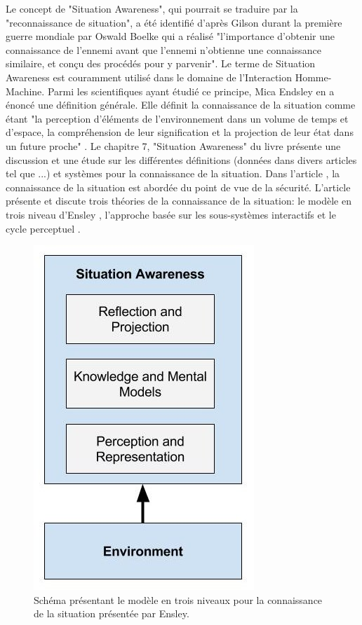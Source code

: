 \documentclass[a4paper,11pt,twoside]{StyleThese}
\begin{document}
Le concept de "Situation Awareness", qui pourrait se traduire par la "reconnaissance de situation", a été identifié d'après Gilson \cite{gilson1995} durant la première guerre mondiale par Oswald Boelke qui a réalisé "l'importance d'obtenir une connaissance de l'ennemi avant que l'ennemi n'obtienne une connaissance similaire, et conçu des procédés pour y parvenir". Le terme de Situation Awareness est couramment utilisé dans le domaine de l'Interaction Homme-Machine. Parmi les scientifiques ayant étudié ce principe, Mica Endsley en a énoncé une définition générale. Elle définit la connaissance de la situation comme étant "la perception d'éléments de l'environnement dans un volume de temps et d'espace, la compréhension de leur signification et la projection de leur état dans un future proche" \cite{endsley2000}.
Le chapitre 7, "Situation Awareness" du livre \cite{pew1998modeling} présente une discussion et une étude sur les différentes définitions (données dans divers articles tel que \cite{stiffler1988graduate,noble1989application,fracker1988theory}...) et systèmes pour la connaissance de la situation. Dans l'article \cite{stanton2001situational}, la connaissance de la situation est abordée du point de vue de la sécurité. L'article présente et discute trois théories de la connaissance de la situation: le modèle en trois niveau d'Ensley \cite{endsley1995}, l'approche basée sur les sous-systèmes interactifs \cite{bedny1999theory} et le cycle perceptuel  \cite{smith1995situation}.

\begin{figure}[ht!]
 \centering
  \includegraphics[width=0.49\linewidth]{./img/ensley.jpg} 
  \caption {Schéma présentant le modèle en trois niveaux pour la connaissance de la situation présentée par Ensley.}
  \label{fig:ensley}
\end{figure}
\end{document}
